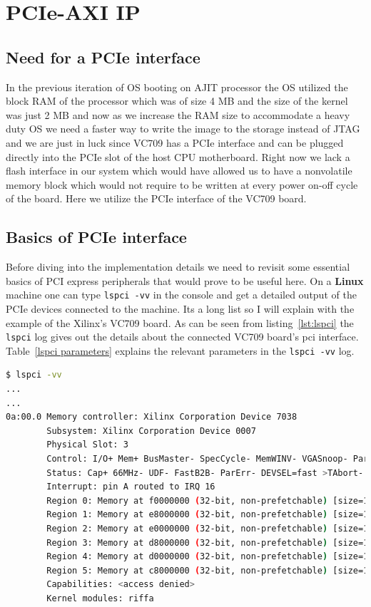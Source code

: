 \section{PCIe-AXI IP}

\subsection{Need for a PCIe interface}

In the previous iteration of OS booting on AJIT processor the OS utilized the block RAM of the processor which was of size 4 MB
and the size of the kernel was just 2 MB and now as we increase the RAM size to accommodate a heavy duty OS we need a faster way to write
the image to the storage instead of JTAG and we are just in luck since VC709 has a PCIe interface and can be plugged directly into the PCIe
slot of the host CPU motherboard.  Right now we lack a flash interface in our system which would have allowed us to have a nonvolatile
memory block which would not require to be written at every power on-off cycle of the board. Here we utilize the PCIe interface of the
VC709 board.

\subsection{Basics of PCIe interface}

Before diving into the implementation details we need to revisit some essential basics of PCI express peripherals that would prove to be
useful here.  On a \textbf{Linux} machine one can type \verb|lspci -vv| in the console and get a detailed output of the PCIe devices
connected to the machine. Its a long list so I will explain with the example of the Xilinx's VC709 board. As can be seen from
listing~\ref{lst:lspci} the \verb|lspci| log gives out the details about the connected VC709 board's pci interface. Table~\ref{lspci
parameters} explains the relevant parameters in the \verb|lspci -vv| log.

\pagebreak

\singlespacing
\scriptsize{
\begin{lstlisting}[language=bash, caption=lspci log,label={lst:lspci}, emph={Region, lspci, vv, 0a:00\.0}]
$ lspci -vv
...
...
0a:00.0 Memory controller: Xilinx Corporation Device 7038 
        Subsystem: Xilinx Corporation Device 0007 
        Physical Slot: 3 
        Control: I/O+ Mem+ BusMaster- SpecCycle- MemWINV- VGASnoop- ParErr+ Steppi......
        Status: Cap+ 66MHz- UDF- FastB2B- ParErr- DEVSEL=fast >TAbort- <TAbort- <M......
        Interrupt: pin A routed to IRQ 16 
        Region 0: Memory at f0000000 (32-bit, non-prefetchable) [size=128M] 
        Region 1: Memory at e8000000 (32-bit, non-prefetchable) [size=128M] 
        Region 2: Memory at e0000000 (32-bit, non-prefetchable) [size=128M] 
        Region 3: Memory at d8000000 (32-bit, non-prefetchable) [size=128M] 
        Region 4: Memory at d0000000 (32-bit, non-prefetchable) [size=128M] 
        Region 5: Memory at c8000000 (32-bit, non-prefetchable) [size=128M] 
        Capabilities: <access denied> 
        Kernel modules: riffa
\end{lstlisting}
}

